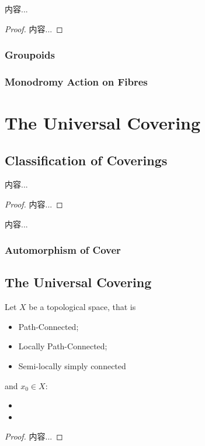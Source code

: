 \documentclass[Total.tex]{subfiles}
\begin{document}
			\begin{corollary}
				内容...
			\end{corollary}
			\begin{proof}
				内容...
			\end{proof}
			
			\subsubsection{Groupoids}
			\subsubsection{Monodromy Action on Fibres}
		\section{The Universal Covering}
			
			\subsection{Classification of Coverings}
			
			\begin{theorem}
				内容...
			\end{theorem}
			\begin{proof}
				内容...
			\end{proof}
			
			\begin{Def}
				内容...
			\end{Def}
			\subsubsection{Automorphism of Cover}
			\subsection{The Universal Covering}
			
			\begin{proposition}
				Let $X$ be a topological space, that is
				\begin{itemize}
					\item Path-Connected;
					\item Locally Path-Connected;
					\item Semi-locally simply connected
				\end{itemize}
				and $x_0\in X$:
				\begin{itemize}
					\item 
					\item 
				\end{itemize}
			\end{proposition}
			\begin{proof}
				内容...
			\end{proof}
			
\end{document}

